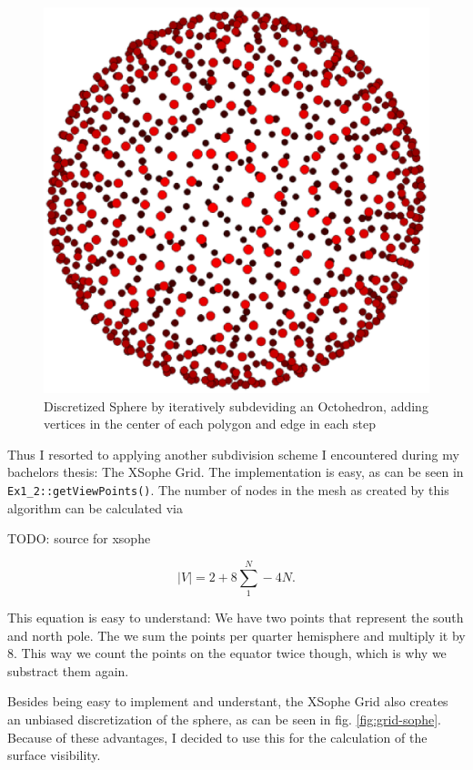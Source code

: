 \documentclass[a4paper,10pt,notitlepage]{scrreprt}
\begin{document}
\begin{figure}
 \centering
 \includegraphics[scale=0.5]{platonic-grid.eps}
 \caption{Discretized Sphere by iteratively subdeviding an Octohedron, adding
vertices in the center of each polygon and edge in each step}
 \label{fig:grid-platonic}
\end{figure}

Thus I resorted to applying another subdivision scheme I encountered during my
bachelors thesis: The XSophe Grid. The implementation is easy, as can be seen
in \texttt{Ex1\_2::getViewPoints()}. The number of nodes in the mesh as created
by this algorithm can be calculated via

TODO: source for xsophe

\begin{equation}
 |V| = 2 + 8 \sum_1^N - 4 N .
\end{equation}

This equation is easy to understand: We have two points that represent the
south and north pole. The we sum the points per quarter hemisphere and multiply
it by 8. This way we count the points on the equator twice though, which is why
we substract them again.

Besides being easy to implement and understant, the XSophe Grid also creates an
unbiased discretization of the sphere, as can be seen in fig.
\ref{fig:grid-sophe}. Because of these advantages, I decided to use this for
the calculation of the surface visibility.
\end{document}
